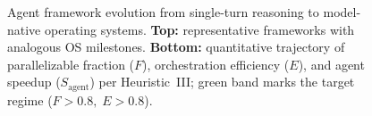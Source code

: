 \begin{figure}[htbp]


\caption{Agent framework evolution from single-turn reasoning to model-native operating systems.
\textbf{Top:} representative frameworks with analogous OS milestones.
\textbf{Bottom:} quantitative trajectory of parallelizable fraction ($F$), orchestration efficiency ($E$), and agent speedup ($S_{\mathrm{agent}}$) per Heuristic~III; green band marks the target regime ($F{>}0.8,\;E{>}0.8$).}
\label{fig_agent_timeline}
\end{figure}
